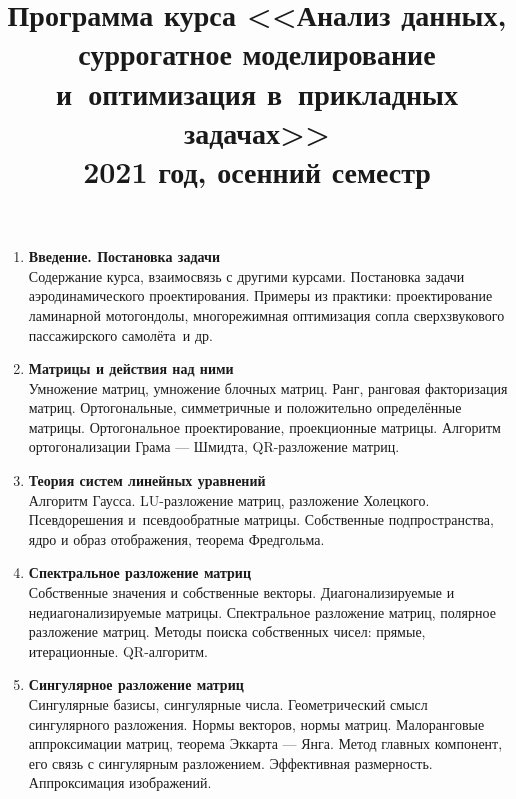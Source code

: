\documentclass[12pt,oneside,openany]{article}
\begin{document}
\title{
  \large
  \textbf{Программа курса <<Анализ данных, суррогатное моделирование и~оптимизация в~прикладных задачах>>} \\
  2021 год, осенний семестр
}

\author{}
\date{}

\maketitle
\thispagestyle{empty}

\vspace{-10ex}


\begin{enumerate}

  \item \textbf{Введение. Постановка задачи} \\
  Содержание курса, взаимосвязь с другими курсами. Постановка задачи аэродинамического проектирования. Примеры из практики: проектирование ламинарной мотогондолы, многорежимная оптимизация сопла сверхзвукового пассажирского самолёта~и др.

  \item \textbf{Матрицы и действия над ними} \\
  Умножение матриц, умножение блочных матриц. Ранг, ранговая факторизация матриц. Ортогональные, симметричные и положительно определённые матрицы. Ортогональное проектирование, проекционные матрицы. Алгоритм ортогонализации Грама --- Шмидта, QR-разложение матриц.

  \item \textbf{Теория систем линейных уравнений} \\
  Алгоритм Гаусса. LU-разложение матриц, разложение Холецкого. Псевдорешения и~псевдообратные матрицы. Собственные подпространства, ядро и образ отображения, теорема Фредгольма.

  \item \textbf{Спектральное разложение матриц} \\
  Собственные значения и собственные векторы. Диагонализируемые и недиагонализируемые матрицы. Спектральное разложение матриц, полярное разложение матриц. Методы поиска собственных чисел: прямые, итерационные. QR-алгоритм.

  \item \textbf{Сингулярное разложение матриц} \\
  Сингулярные базисы, сингулярные числа. Геометрический смысл сингулярного разложения. Нормы векторов, нормы матриц. Малоранговые аппроксимации матриц, теорема Эккарта --- Янга. Метод главных компонент, его связь с сингулярным разложением. Эффективная размерность. Аппроксимация изображений.


\end{enumerate}
\end{document}
